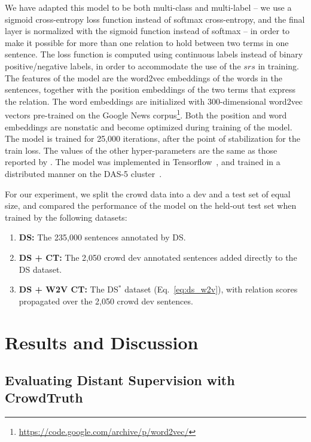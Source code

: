We have adapted this model to be both multi-class and multi-label -- we use a sigmoid cross-entropy loss function instead of softmax cross-entropy, and the final layer is normalized with the sigmoid function instead of softmax -- in order to make it possible for more than one relation to hold between two terms in one sentence. The loss function is computed using continuous labels instead of binary positive/negative labels, in order to accommodate the use of the $srs$ in training. The features of the model are the word2vec embeddings of the words in the sentences, together with the position embeddings of the two terms that express the relation. The word embeddings are initialized with 300-dimensional word2vec vectors pre-trained on the Google News corpus\footnote{\url{https://code.google.com/archive/p/word2vec/}}. Both the position and word embeddings are nonstatic and become optimized during training of the model. The model is trained for 25,000 iterations, after the point of stabilization for the train loss.  The values of the other hyper-parameters are the same as those reported by \citet{nguyen2015relation}. The model was implemented in Tensorflow~\cite{abadi2016tensorflow}, and trained in a distributed manner on the DAS-5 cluster~\cite{bal2016medium}. 

For our experiment, we split the crowd data into a dev and a test set of equal size, and compared the performance of the model on the held-out test set when trained by the following datasets:

\begin{enumerate}
\item \textbf{DS:} The 235,000 sentences annotated by DS.
\item \textbf{DS + CT:} The 2,050 crowd dev annotated sentences added directly to the DS dataset.
\item \textbf{DS + W2V CT:} The DS$^{*}$ dataset (Eq.~\ref{eq:ds_w2v}), with relation scores propagated over the 2,050 crowd dev sentences.
\end{enumerate}

\section{Results and Discussion}

\subsection{Evaluating Distant Supervision with CrowdTruth}

